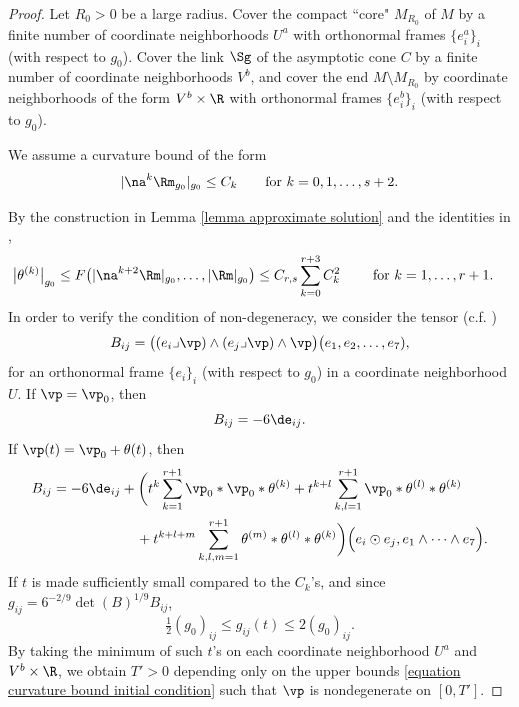 \documentclass[hidelinks, 12pt, oneside, reqno]{amsart}
\begin{document}
\begin{proof}
    Let $R_0 > 0$ be a large radius. Cover the compact ``core" $M_{R_0}$ of $M$ by a finite number of coordinate neighborhoods $U^a$ with orthonormal frames $\{e_i^a\}_i$ (with respect to $g_0$). Cover the link $\Sg$ of the asymptotic cone $C$ by a finite number of coordinate neighborhoods $V^b$, and cover the end $M \setminus M_{R_0}$ by coordinate neighborhoods of the form $V^b \times \R$ with orthonormal frames $\{e_i^b\}_i$ (with respect to $g_0$). 

    We assume a curvature bound of the form
    \begin{equation}\label{equation curvature bound initial condition}
        |\na^k \Rm_{g_0}|_{g_0} \le C_k \qquad \text{for }k = 0,1,\ldots, s+2. 
    \end{equation}
    
    By the construction in Lemma \ref{lemma approximate solution} and the identities in \cite[\S 2]{LotayWeiLaplacianFlow}, 
    \begin{align*}
    \big|\theta^{(k)}\big|_{g_0} &\le F\big(|\na^{k+2} \Rm|_{g_0}, \ldots,|\Rm|_{g_0}\big) \le C_{r,s}\sum_{k=0}^{r+3} C_k^2  \qquad \text{ for }k = 1, \ldots, r+1. 
    \end{align*}
    In order to verify the condition of non-degeneracy, we consider the tensor (c.f. \cite[\S 2.1]{KarigiannisFlows})
    \[
    B_{ij} = \big((e_i \lrcorner \vp) \wedge (e_j \lrcorner \vp) \wedge \vp \big)\big(e_1,e_2, \ldots, e_7),
    \]
    for an orthonormal frame $\{e_i\}_i$ (with respect to $g_0$) in a coordinate neighborhood $U$. If $\vp = \vp_0$, then 
    \[
    B_{ij} = -6\de_{ij}.
    \]
    If $\vp(t) = \vp_0 + \theta(t)$, then
    \begin{align*}
        B_{ij} &= -6 \de_{ij} + \bigg(t^k \sum_{k = 1}^{r+1} \vp_0 * \vp_0 * \theta^{(k)} + t^{k+l} \sum_{k,l = 1}^{r+1} \vp_0 * \theta^{(l)} * \theta^{(k)} \\ &\qquad  \qquad  \qquad +  t^{k+l+m} \sum_{k,l,m = 1}^{r+1} \theta^{(m)} * \theta^{(l)} * \theta^{(k)}\bigg) \Big( e_i \odot e_j, e_1 \wedge \cdots \wedge e_7 \Big).
    \end{align*}
    If $t$ is made sufficiently small compared to the $C_k$'s, and since $g_{ij} = 6^{-2/9}\det(B)^{1/9}B_{ij}$, 
    \[
    \tfrac12 (g_0)_{ij}\le g_{ij}(t) \le 2 (g_0)_{ij}.
    \]
    By taking the minimum of such $t$'s on each coordinate neighborhood $U^a$ and $V^b \times \R$, we obtain $T' > 0$ depending only on the upper bounds \eqref{equation curvature bound initial condition} such that $\vp$ is nondegenerate on $[0,T']$. 
\end{proof}
\end{document}
